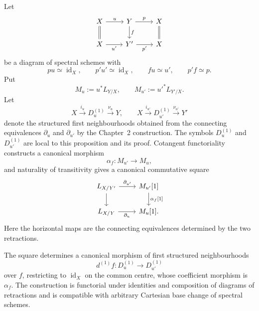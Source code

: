 \begin{proposition}
\label{prop:first-neighbourhood-functoriality}
Let
\[
\begin{tikzcd}
X \arrow[r,"u"] \arrow[d,equal] &
Y \arrow[d,"f"] \arrow[r,"p"] &
X \arrow[d,equal]\\
X \arrow[r,"u'"'] &
Y' \arrow[r,"p'"'] &
X
\end{tikzcd}
\]
be a diagram of spectral schemes with
\[
    pu\simeq\operatorname{id}_X,
    \qquad
    p'u'\simeq\operatorname{id}_X,
    \qquad
    fu\simeq u',
    \qquad
    p'f\simeq p.
\]
Put
\[
    M_u:=u^*L_{Y/X},
    \qquad
    M_{u'}:=u'^*L_{Y'/X}.
\]
Let
\[
    X\xrightarrow{i_u}D^{(1)}_u\xrightarrow{\nu_u}Y,
    \qquad
    X\xrightarrow{i_{u'}}D^{(1)}_{u'}\xrightarrow{\nu_{u'}}Y'
\]
denote the structured first neighbourhoods obtained from the connecting
equivalences \(\partial_u\) and \(\partial_{u'}\) by the Chapter~2
construction.  The symbols \(D^{(1)}_u\) and \(D^{(1)}_{u'}\) are local to
this proposition and its proof.
Cotangent functoriality constructs a canonical morphism
\[
    \alpha_f:
    M_{u'}
    \longrightarrow
    M_u,
\]
and naturality of transitivity gives a canonical commutative square
\[
\begin{tikzcd}
L_{X/Y'} \arrow[r,"\partial_{u^{\prime}}"] \arrow[d] &
M_{u'}[1] \arrow[d,"{\alpha_f[1]}"]\\
L_{X/Y} \arrow[r,"\partial_u"'] &
M_u[1].
\end{tikzcd}
\]
Here the horizontal maps are the connecting equivalences determined by the
two retractions.

The square determines a canonical morphism of first structured
neighbourhoods
\[
    d^{(1)}f:
    D^{(1)}_u
    \longrightarrow
    D^{(1)}_{u'}
\]
over $f$, restricting to $\operatorname{id}_X$ on the common centre, whose
coefficient morphism is $\alpha_f$.  The construction is functorial under
identities and composition of diagrams of retractions and is compatible with
arbitrary Cartesian base change of spectral schemes.
\end{proposition}

